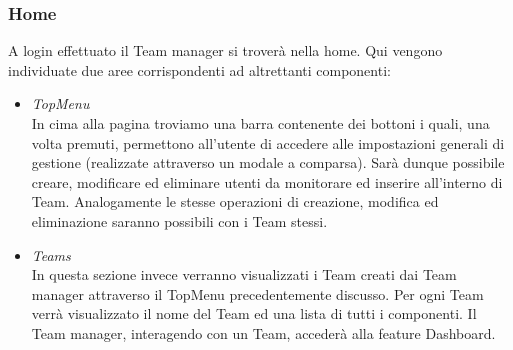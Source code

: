 \subsubsection{Home}
A login effettuato il Team manager si troverà nella home.\newline
Qui vengono individuate due aree corrispondenti ad altrettanti componenti:
\begin{itemize}
  \item \emph{TopMenu}\\
  In cima alla pagina troviamo una barra contenente dei bottoni i quali, una volta premuti, permettono all'utente di accedere alle impostazioni generali di gestione (realizzate attraverso un modale a comparsa).\newline
  Sarà dunque possibile creare, modificare ed eliminare utenti da monitorare ed inserire all'interno di Team.\newline
  Analogamente le stesse operazioni di creazione, modifica ed eliminazione saranno possibili con i Team stessi.
  \item \emph{Teams}\\
  In questa sezione invece verranno visualizzati i Team creati dai Team manager attraverso il TopMenu precedentemente discusso.\newline
  Per ogni Team verrà visualizzato il nome del Team ed una lista di tutti i componenti.\newline
  Il Team manager, interagendo con un Team, accederà alla feature Dashboard.
\end{itemize}
